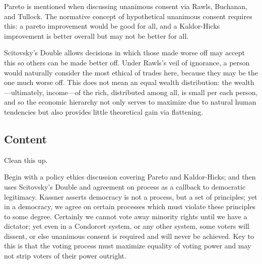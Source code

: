 \begin{boxcomment}
    Pareto is mentioned when discussing unanimous consent via Rawls, Buchanan, and Tullock.  The normative concept of hypothetical unanimous consent requires this:  a pareto improvement would be good for all, and a Kaldor-Hicks improvement is better overall but may not be better for all.

    Scitovsky's Double allows decisions in which those made worse off may accept this so others can be made better off.  Under Rawls's veil of ignorance, a person would naturally consider the most ethical of trades here, because they may be the one much worse off.  This does not mean an equal wealth distribution:  the wealth—ultimately, income—of the rich, distributed among all, is small per each person, and so the economic hierarchy not only serves to maximize due to natural human tendencies but also provides little theoretical gain via flattening.

\end{boxcomment}

\subsection{Content}

\begin{todo}
    Clean this up.
\end{todo}
Begin with a policy ethics discussion covering Pareto and Kaldor-Hicks; and then uses Scitovsky's Double and agreement on process as a callback to democratic legitimacy.  Kassner asserts democracy is not a process, but a set of principles; yet in a democracy, we agree on certain processes which must violate these principles to some degree.  Certainly we cannot vote away minority rights until we have a dictator; yet even in a Condorcet system, or any other system, some voters will dissent, or else unanimous consent is required and will never be achieved.  Key to this is that the voting process must maximize equality of voting power and may not strip voters of their power outright.


